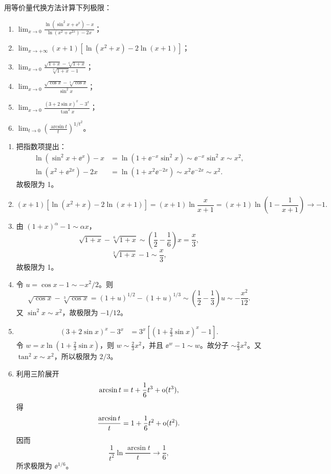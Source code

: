\begin{xexercise}[4]
用等价量代换方法计算下列极限：
  \begin{enumerate}
    \item $\displaystyle\lim_{x\to0}\frac{\ln(\sin^2x+\ee^x)-x}{\ln(x^2+\ee^{2x})-2x}$；
    \item $\displaystyle\lim_{x\to+\infty}(x+1)[\ln(x^2+x)-2\ln(x+1)]$；
    \item $\displaystyle\lim_{x\to0}\frac{\sqrt{1+x}-\sqrt[6]{1+x}}{\sqrt[3]{1+x}-1}$；
    \item $\displaystyle\lim_{x\to0}\frac{\sqrt{\cos x}-\sqrt[3]{\cos x}}{\sin^2x}$；
    \item $\displaystyle\lim_{x\to0}\frac{(3+2\sin x)^x-3^x}{\tan^2x}$；
    \item $\displaystyle\lim_{t\to0}\left(\frac{\arcsin t}{t}\right)^{1/t^2}$。
  \end{enumerate}
\end{xexercise}
\begin{xsolution}
\begin{enumerate}[label=(\arabic*)]
  \item 把指数项提出：
  \begin{align*}
    \ln(\sin^2x+\ee^x)-x
    &=\ln(1+\ee^{-x}\sin^2x)
      \sim\ee^{-x}\sin^2x\sim x^2,\\
    \ln(x^2+\ee^{2x})-2x
    &=\ln(1+x^2\ee^{-2x})
      \sim x^2\ee^{-2x}\sim x^2.
  \end{align*}
  故极限为 1。

  \item
  \[
    (x+1)[\ln(x^2+x)-2\ln(x+1)]
    =(x+1)\ln\frac{x}{x+1}
    =(x+1)\ln\left(1-\frac1{x+1}\right)\to-1.
  \]

  \item 由 $(1+x)^\alpha-1\sim\alpha x$，
  \[
    \sqrt{1+x}-\sqrt[6]{1+x}
    \sim\left(\frac12-\frac16\right)x=\frac x3,
  \]
  \[
    \sqrt[3]{1+x}-1\sim\frac x3,
  \]
  故极限为 1。

  \item 令 $u=\cos x-1\sim-x^2/2$。则
  \[
    \sqrt{\cos x}-\sqrt[3]{\cos x}
    =(1+u)^{1/2}-(1+u)^{1/3}
    \sim\left(\frac12-\frac13\right)u
    \sim-\frac{x^2}{12}.
  \]
  又 $\sin^2x\sim x^2$，故极限为 $-1/12$。

  \item
  \begin{align*}
    (3+2\sin x)^x-3^x
    &=3^x\left[\left(1+\frac23\sin x\right)^x-1\right].
  \end{align*}
  令
  $w=x\ln(1+\frac23\sin x)$，则 $w\sim\frac23x^2$，并且 $\ee^w-1\sim w$。故分子
  $\sim\frac23x^2$。又 $\tan^2x\sim x^2$，所以极限为 $2/3$。

  \item 利用三阶展开
  \[
    \arcsin t=t+\frac16t^3+\mathrm{o}(t^3),
  \]
  得
  \[
    \frac{\arcsin t}{t}=1+\frac16t^2+\mathrm{o}(t^2).
  \]
  因而
  \[
    \frac1{t^2}\ln\frac{\arcsin t}{t}\to\frac16,
  \]
  所求极限为 $\ee^{1/6}$。
\end{enumerate}
\end{xsolution}


